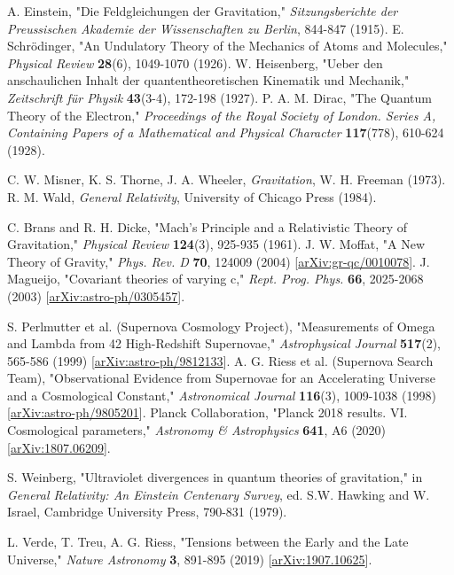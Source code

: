 \documentclass[11pt,a4paper]{article}
\begin{document}
\begin{thebibliography}{99} 


 A. Einstein, "Die Feldgleichungen der Gravitation," \textit{Sitzungsberichte der Preussischen Akademie der Wissenschaften zu Berlin}, 844-847 (1915).
 E. Schr\"odinger, "An Undulatory Theory of the Mechanics of Atoms and Molecules," \textit{Physical Review} \textbf{28}(6), 1049-1070 (1926).
 W. Heisenberg, "Ueber den anschaulichen Inhalt der quantentheoretischen Kinematik und Mechanik," \textit{Zeitschrift f\"ur Physik} \textbf{43}(3-4), 172-198 (1927).
 P. A. M. Dirac, "The Quantum Theory of the Electron," \textit{Proceedings of the Royal Society of London. Series A, Containing Papers of a Mathematical and Physical Character} \textbf{117}(778), 610-624 (1928).


 C. W. Misner, K. S. Thorne, J. A. Wheeler, \textit{Gravitation}, W. H. Freeman (1973).
 R. M. Wald, \textit{General Relativity}, University of Chicago Press (1984).


 C. Brans and R. H. Dicke, "Mach's Principle and a Relativistic Theory of Gravitation," \textit{Physical Review} \textbf{124}(3), 925-935 (1961).
 J. W. Moffat, "A New Theory of Gravity," \textit{Phys. Rev. D} \textbf{70}, 124009 (2004) [\url{arXiv:gr-qc/0010078}]. %
 J. Magueijo, "Covariant theories of varying c," \textit{Rept. Prog. Phys.} \textbf{66}, 2025-2068 (2003) [\url{arXiv:astro-ph/0305457}]. 


 S. Perlmutter et al. (Supernova Cosmology Project), "Measurements of Omega and Lambda from 42 High-Redshift Supernovae," \textit{Astrophysical Journal} \textbf{517}(2), 565-586 (1999) [\url{arXiv:astro-ph/9812133}]. 
 A. G. Riess et al. (Supernova Search Team), "Observational Evidence from Supernovae for an Accelerating Universe and a Cosmological Constant," \textit{Astronomical Journal} \textbf{116}(3), 1009-1038 (1998) [\url{arXiv:astro-ph/9805201}]. 
 Planck Collaboration, "Planck 2018 results. VI. Cosmological parameters," \textit{Astronomy \& Astrophysics} \textbf{641}, A6 (2020) [\url{arXiv:1807.06209}]. 


 S. Weinberg, "Ultraviolet divergences in quantum theories of gravitation," in \textit{General Relativity: An Einstein Centenary Survey}, ed. S.W. Hawking and W. Israel, Cambridge University Press, 790-831 (1979).


 L. Verde, T. Treu, A. G. Riess, "Tensions between the Early and the Late Universe," \textit{Nature Astronomy} \textbf{3}, 891-895 (2019) [\url{arXiv:1907.10625}].

\end{thebibliography}
\end{document}
